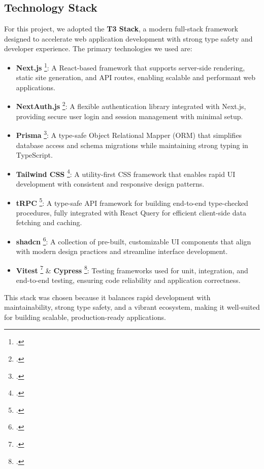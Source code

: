 
\subsection{Technology Stack}

For this project, we adopted the \textbf{T3 Stack}, a modern full-stack framework designed to accelerate web application development with strong type safety and developer experience. The primary technologies we used are:

\begin{itemize}
	\item \textbf{Next.js} \footcite{NextjsVercelReact}: A React-based framework that supports server-side rendering, static site generation, and API routes, enabling scalable and performant web applications.

	\item \textbf{NextAuth.js} \footcite{AuthjsAuthenticationWeb}: A flexible authentication library integrated with Next.js, providing secure user login and session management with minimal setup.

	\item \textbf{Prisma} \footcite{PrismaInstantPostgres}: A type-safe Object Relational Mapper (ORM) that simplifies database access and schema migrations while maintaining strong typing in TypeScript.

	\item \textbf{Tailwind CSS} \footcite{TailwindCSSRapidly}: A utility-first CSS framework that enables rapid UI development with consistent and responsive design patterns.

	\item \textbf{tRPC} \footcite{TRPCMoveFast2022}: A type-safe API framework for building end-to-end type-checked procedures, fully integrated with React Query for efficient client-side data fetching and caching.

	\item \textbf{shadcn} \footcite{shadcnFoundationYourDesign}: A collection of pre-built, customizable UI components that align with modern design practices and streamline interface development.

	\item \textbf{Vitest} \footcite{Vitest} \& \textbf{Cypress} \footcite{TestingFrameworksJavascript}: Testing frameworks used for unit, integration, and end-to-end testing, ensuring code reliability and application correctness.
\end{itemize}

This stack was chosen because it balances rapid development with maintainability, strong type safety, and a vibrant ecosystem, making it well-suited for building scalable, production-ready applications.

